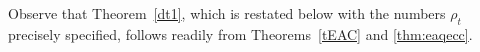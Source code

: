 \documentclass{article}
\theoremstyle{remark}
\theoremstyle{definition}
\numberwithin{equation}{section}
\begin{document}
%

Observe that Theorem~\ref{dt1}, which is restated below with the numbers $\rho_t$ precisely specified, follows readily from Theorems~\ref{tEAC} and \ref{thm:eaqecc}.
\end{document}
